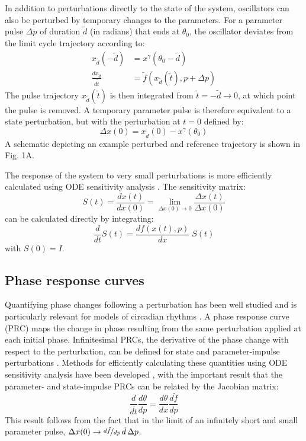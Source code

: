 \documentclass[11pt, letterpaper]{article}
\begin{document}
In addition to perturbations directly to the state of the system, oscillators can also be perturbed by temporary changes to the parameters.
For a parameter pulse $\Delta p$ of duration $\tilde{d}$ (in radians) that ends at $\theta_0$, the oscillator deviates from the limit cycle trajectory according to:
\begin{align}
  x_{\tilde{d}}(-\tilde{d}) &= x^\gamma(\theta_0 - \tilde{d}) \\
  \frac{dx_{\tilde{d}}}{d\tilde{t}} &= \tilde{f}(x_{\tilde{d}}(\tilde{t}), p + \Delta p) \label{eq:ode_pert}
\end{align}
The pulse trajectory $x_{\tilde{d}}(\tilde{t})$ is then integrated from $\tilde{t} = -\tilde{d} \to 0$, at which point the pulse is removed.
A temporary parameter pulse is therefore equivalent to a state perturbation, but with the perturbation at $t = 0$ defined by:
\begin{equation}
  \Delta x(0) = x_{\tilde{d}}(0) - x^\gamma(\theta_0)
\end{equation}
A schematic depicting an example perturbed and reference trajectory is shown in Fig. 1A.

The response of the system to very small perturbations is more efficiently calculated using ODE sensitivity analysis \cite{Rabitz1983}.
The sensitivity matrix:
\begin{equation}
  S(t) = \frac{dx(t)}{dx(0)} = \lim_{\Delta x(0) \to 0}\frac{\Delta x(t)}{\Delta x(0)}
  \label{eq:senslimit}
\end{equation}
can be calculated directly by integrating:
\begin{equation}
  \frac{d}{dt} S(t)  = \frac{df(x(t),p)}{dx}\; S(t)
  \label{eq:odesens}
\end{equation}
with $S(0) = I$.

\subsection*{Phase response curves}
Quantifying phase changes following a perturbation has been well studied and is particularly relevant for models of circadian rhythms \cite{Kramer1984, Taylor2008a}.
A phase response curve (PRC) maps the change in phase resulting from the same perturbation applied at each initial phase.
Infinitesimal PRCs, the derivative of the phase change with respect to the perturbation, can be defined for state and parameter-impulse perturbations \cite{Taylor2008a}.
Methods for efficiently calculating these quantities using ODE sensitivity analysis have been developed \cite{Taylor2008a}, with the important result that the parameter- and state-impulse PRCs can be related by the Jacobian matrix:
\begin{equation}
  \frac{d}{d\tilde{t}}\frac{d\theta}{dp} = \frac{d\theta}{dx}\frac{d\tilde{f}}{dp} 
  \label{eq:pPRCequiv}
\end{equation}
This result follows from the fact that in the limit of an infinitely short and small parameter pulse, $\Delta x(0) \to \nicefrac{d\tilde{f}}{dp}\,\tilde{d}\, \Delta p$.
\end{document}
